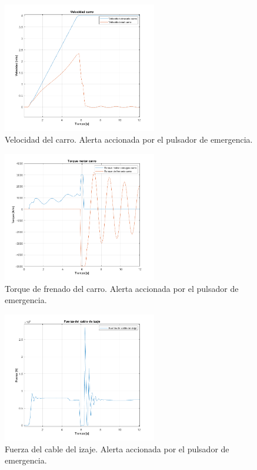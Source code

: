 \documentclass[11pt]{article}
\begin{document}
\begin{figure}[!h]
	\centering
	\includegraphics[width=0.6\textwidth]{images/Freno_emergencia/velocidad_carro.png}
	\caption{Velocidad del carro. Alerta accionada por el pulsador de emergencia.}
	\label{fig:pulsador_emergencia_velocidad_carro}
\end{figure}

\begin{figure}[!h]
	\centering
	\includegraphics[width=0.6\textwidth]{images/Freno_emergencia/torque_motor_carro.png}
	\caption{Torque de frenado del carro. Alerta accionada por el pulsador de emergencia.}
	\label{fig:pulsador_emergencia_torque_motor_carro}
\end{figure}

\begin{figure}[!h]
	\centering
	\includegraphics[width=0.6\textwidth]{images/Freno_emergencia/fuerza_cable_izaje.png}
	\caption{Fuerza del cable del izaje. Alerta accionada por el pulsador de emergencia.}
	\label{fig:pulsador_emergencia_fuerza_cable_izaje}
\end{figure}
\end{document}
